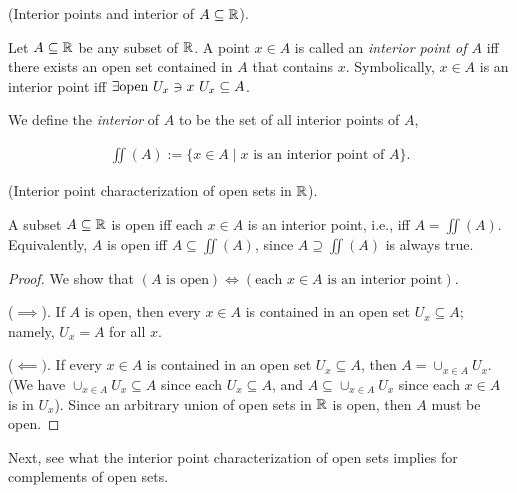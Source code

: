 \begin{defn}
    (Interior points and interior of $A \subseteq \mathbb{R}$).
    
    Let $A \subseteq \mathbb{R}$ be any subset of $\mathbb{R}$. A point $x \in A$ is called an \textit{interior point of $A$} iff there exists an open set contained in $A$ that contains $x$. Symbolically, $x \in A$ is an interior point iff ${\exists \text{open } U_x \ni x \text{ } U_x \subseteq A}$. 
    
    We define the \textit{interior} of $A$ to be the set of all interior points of $A$,
    
    \begin{align*}
        \iint(A) := \{ x \in A \mid \text{$x$ is an interior point of $A$} \}.
    \end{align*}
\end{defn}

\begin{theorem}
\label{ch::topology::thm::interior_point_char_R}
    (Interior point characterization of open sets in $\mathbb{R}$).
    
    A subset $A \subseteq \mathbb{R}$ is open iff each $x \in A$ is an interior point, i.e., iff $A = \iint(A)$. Equivalently, $A$ is open iff $A \subseteq \iint(A)$, since $A \supseteq \iint(A)$ is always true.
\end{theorem}

\begin{proof}
    We show that $(\text{$A$ is open}) \iff (\text{each $x \in A$ is an interior point})$.
    
    ($\implies$). If $A$ is open, then every $x \in A$ is contained in an open set $U_x \subseteq A$; namely, $U_x = A$ for all $x$.
    
    ($\impliedby)$. If every $x \in A$ is contained in an open set $U_x \subseteq A$, then $A = \cup_{x \in A} U_x$. (We have $\cup_{x \in A} U_x \subseteq A$ since each $U_x \subseteq A$, and $A \subseteq \cup_{x \in A} U_x$ since each $x \in A$ is in $U_x$). Since an arbitrary union of open sets in $\mathbb{R}$ is open, then $A$ must be open. 
\end{proof}

Next, see what the interior point characterization of open sets implies for complements of open sets.

